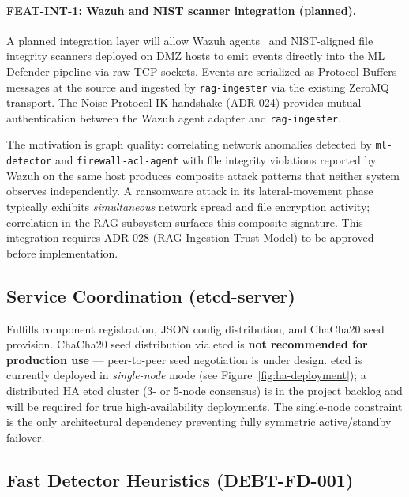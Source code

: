 \documentclass[11pt,a4paper]{article}
\begin{document}
    \paragraph{FEAT-INT-1: Wazuh and NIST scanner integration (planned).}
    \label{sec:future:wazuh}
    A planned integration layer will allow Wazuh agents~\cite{wazuh2024} and
    NIST-aligned file integrity scanners deployed on DMZ hosts to emit events
    directly into the ML Defender pipeline via raw TCP sockets. Events are
    serialized as Protocol Buffers messages at the source and ingested by
    \texttt{rag-ingester} via the existing ZeroMQ transport. The Noise Protocol
    IK handshake (ADR-024) provides mutual authentication between the Wazuh
    agent adapter and \texttt{rag-ingester}.

    The motivation is graph quality: correlating network anomalies detected by
    \texttt{ml-detector} and \texttt{firewall-acl-agent} with file integrity
    violations reported by Wazuh on the same host produces composite attack
    patterns that neither system observes independently. A ransomware attack in
    its lateral-movement phase typically exhibits \emph{simultaneous} network
    spread and file encryption activity; correlation in the RAG subsystem surfaces
    this composite signature. This integration requires ADR-028 (RAG Ingestion
    Trust Model) to be approved before implementation.

    \subsection{Service Coordination (etcd-server)}

    Fulfills component registration, JSON config distribution, and ChaCha20 seed provision.
    ChaCha20 seed distribution via etcd is \textbf{not recommended for production use} ---
    peer-to-peer seed negotiation is under design. etcd is currently deployed in \emph{single-node}
    mode (see Figure~\ref{fig:ha-deployment}); a distributed HA etcd cluster (3- or 5-node
    consensus) is in the project backlog and will be required for true high-availability
    deployments. The single-node constraint is the only architectural dependency preventing
    fully symmetric active/standby failover.

    \subsection{Fast Detector Heuristics (DEBT-FD-001)}
\end{document}

